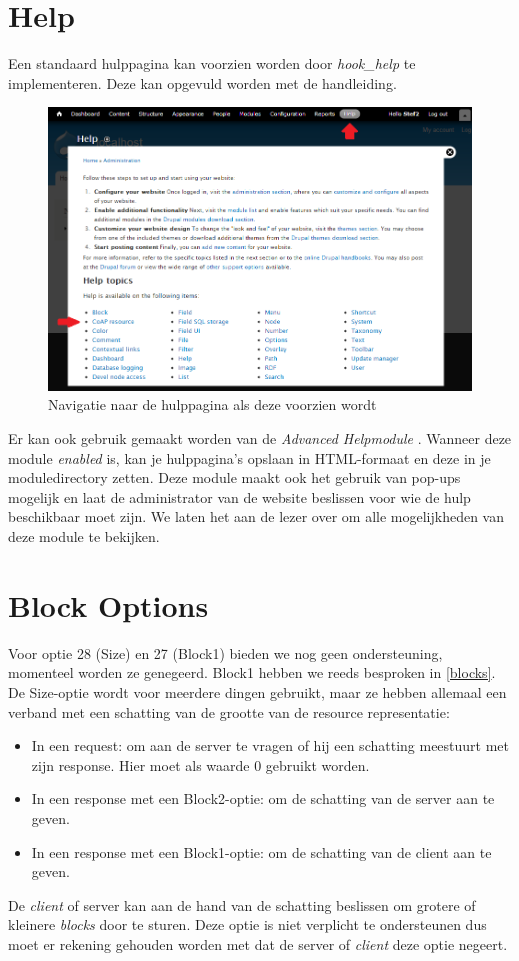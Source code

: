 \section{Help}
Een standaard hulppagina kan voorzien worden door \textit{hook\_help} te implementeren. Deze kan opgevuld worden met de handleiding.
\begin{figure}[h!]
\vspace{10pt}
\includegraphics[width=1\textwidth]{fig/Help}
\vspace{-30pt}
\caption{Navigatie naar de hulppagina als deze voorzien wordt}
\vspace{-10pt}
\end{figure}

Er kan ook gebruik gemaakt worden van de \textit{Advanced Helpmodule} \cite{advancedHelp}. Wanneer deze module \textit{enabled} is, kan je hulppagina's opslaan in HTML-formaat en deze in je moduledirectory zetten. Deze module maakt ook het gebruik van pop-ups mogelijk en laat de administrator van de website beslissen voor wie de hulp beschikbaar moet zijn. We laten het aan de lezer over om alle mogelijkheden van deze module te bekijken.
\section{Block Options} \label{unsupportedBlockOptions}
Voor optie 28 (Size) en 27 (Block1) bieden we nog geen ondersteuning, momenteel worden ze genegeerd. Block1 hebben we reeds besproken in \ref{blocks}. De Size-optie wordt voor meerdere dingen gebruikt, maar ze hebben allemaal een verband met een schatting van de grootte van de resource representatie:
\begin{itemize}
\item In een request: om aan de server te vragen of hij een schatting meestuurt met zijn response. Hier moet als waarde 0 gebruikt worden.
\item In een response met een Block2-optie: om de schatting van de server aan te geven.
\item In een response met een Block1-optie: om de schatting van de client aan te geven.
\end{itemize}
De \textit{client} of server kan aan de hand van de schatting beslissen om grotere of kleinere \textit{blocks} door te sturen. Deze optie is niet verplicht te ondersteunen dus moet er rekening gehouden worden met dat de server of \textit{client} deze optie negeert.


